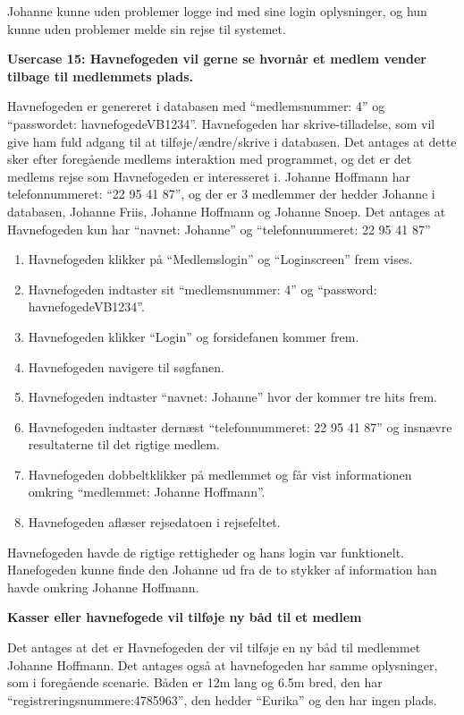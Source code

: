 Johanne kunne uden problemer logge ind med sine login oplysninger, og hun kunne uden problemer melde sin rejse til systemet.

\textbf{Usercase 15: Havnefogeden vil gerne se hvornår et medlem vender tilbage til medlemmets plads.}

Havnefogeden er genereret i databasen med \enquote{medlemsnummer: 4} og \enquote{passwordet: havnefogedeVB1234}. Havnefogeden har skrive-tilladelse, som vil give ham fuld adgang til at tilføje/ændre/skrive i databasen. Det antages at dette sker efter foregående medlems interaktion med programmet, og det er det medlems rejse som Havnefogeden er interesseret i. Johanne Hoffmann har telefonnummeret: \enquote{22 95 41 87}, og der er 3 medlemmer der hedder Johanne i databasen, Johanne Friis, Johanne Hoffmann og Johanne Snoep. Det antages at Havnefogeden kun har \enquote{navnet: Johanne} og \enquote{telefonnummeret: 22 95 41 87}

\begin{enumerate}
	\item Havnefogeden klikker på \enquote{Medlemslogin} og \enquote{Loginscreen} frem vises.
	\item Havnefogeden indtaster sit \enquote{medlemsnummer: 4} og \enquote{password: havnefogedeVB1234}.
	\item Havnefogeden klikker \enquote{Login} og forsidefanen kommer frem.
	\item Havnefogeden navigere til søgfanen.
	\item Havnefogeden indtaster \enquote{navnet: Johanne} hvor der kommer tre hits frem.
	\item Havnefogeden indtaster dernæst \enquote{telefonnummeret: 22 95 41 87} og insnævre resultaterne til det rigtige medlem.
	\item Havnefogeden dobbeltklikker på medlemmet og får vist informationen omkring \enquote{medlemmet: Johanne Hoffmann}.
	\item Havnefogeden aflæser rejsedatoen i rejsefeltet.
\end{enumerate} 

Havnefogeden havde de rigtige rettigheder og hans login var funktionelt. Hanefogeden kunne finde den Johanne ud fra de to stykker af information han havde omkring Johanne Hoffmann.

\textbf{Kasser eller havnefogede vil tilføje ny båd til et medlem}

Det antages at det er Havnefogeden der vil tilføje en ny båd til medlemmet Johanne Hoffmann. Det antages også at havnefogeden har samme oplysninger, som i foregående scenarie. Båden er 12m lang og 6.5m bred, den har \enquote{registreringsnummere:4785963}, den hedder \enquote{Eurika} og den har ingen plads.

